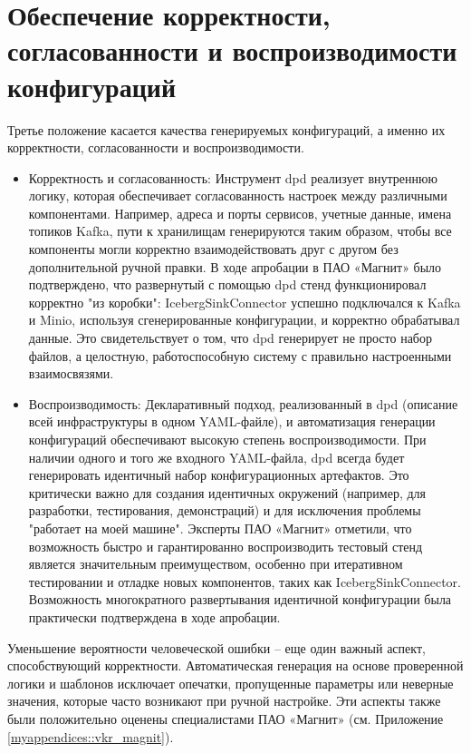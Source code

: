 \section{Обеспечение корректности, согласованности и воспроизводимости конфигураций}

Третье положение касается качества генерируемых конфигураций, а именно их корректности, согласованности и воспроизводимости.
\begin{itemize}  
\item Корректность и согласованность: Инструмент dpd реализует внутреннюю логику, которая обеспечивает согласованность настроек между различными компонентами. Например, адреса и порты сервисов, учетные данные, имена топиков Kafka, пути к хранилищам генерируются таким образом, чтобы все компоненты могли корректно взаимодействовать друг с другом без дополнительной ручной правки. В ходе апробации в ПАО «Магнит» было подтверждено, что развернутый с помощью dpd стенд функционировал корректно "из коробки": IcebergSinkConnector успешно подключался к Kafka и Minio, используя сгенерированные конфигурации, и корректно обрабатывал данные. Это свидетельствует о том, что dpd генерирует не просто набор файлов, а целостную, работоспособную систему с правильно настроенными взаимосвязями.
\item Воспроизводимость: Декларативный подход, реализованный в dpd (описание всей инфраструктуры в одном YAML-файле), и автоматизация генерации конфигураций обеспечивают высокую степень воспроизводимости. При наличии одного и того же входного YAML-файла, dpd всегда будет генерировать идентичный набор конфигурационных артефактов. Это критически важно для создания идентичных окружений (например, для разработки, тестирования, демонстраций) и для исключения проблемы "работает на моей машине". Эксперты ПАО «Магнит» отметили, что возможность быстро и гарантированно воспроизводить тестовый стенд является значительным преимуществом, особенно при итеративном тестировании и отладке новых компонентов, таких как IcebergSinkConnector. Возможность многократного развертывания идентичной конфигурации была практически подтверждена в ходе апробации.
\end{itemize}
Уменьшение вероятности человеческой ошибки – еще один важный аспект, способствующий корректности. Автоматическая генерация на основе проверенной логики и шаблонов исключает опечатки, пропущенные параметры или неверные значения, которые часто возникают при ручной настройке. Эти аспекты также были положительно оценены специалистами ПАО «Магнит» (см. Приложение \ref{myappendices::vkr_magnit}).

